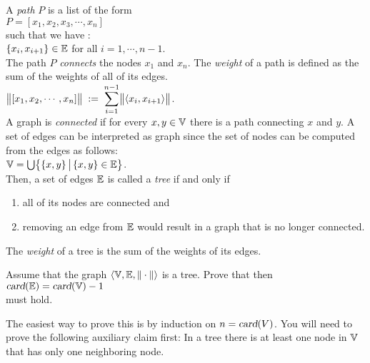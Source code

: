 \noindent
A \emph{path} $P$ is a list of the form 
\\[0.2cm]
\hspace*{1.3cm} 
$P = [ x_1, x_2, x_3, \cdots, x_n ]$ 
\\[0.2cm]
such that we have : \\[0.2cm]
\hspace*{1.3cm}
 $\{x_i,x_{i+1}\} \in {\mathbb E}$  \quad for all $i = 1, \cdots, n-1$.
\\[0.2cm]
The path $P$ \emph{connects} the nodes $x_1$ and $x_n$.  The \emph{weight} of a path is defined as
the sum of the weights of all of its edges.  
\\[0.2cm]
\hspace*{1.3cm}
 $\ds\Weight{[x_1,x_2, \cdots, x_n]} \df \sum\limits_{i=1}^{n-1} \Weight{\pair(x_i,x_{i+1})}$. 
\\[0.2cm]
A graph is \emph{connected} if for every $x,y \in {\mathbb V}$ there is a path connecting $x$ and $y$.
A set of edges can be interpreted as graph since the set of nodes can be computed from the edges as
follows: 
\\[0.2cm]
\hspace*{1.3cm}
${\mathbb V} = \bigcup \bigl\{\{x,y\} \,\big|\, \{x,y\} \in {\mathbb E} \bigr\}$.
\\[0.2cm]
Then, a set of edges ${\mathbb E}$ is called a \emph{tree} if and only if
\begin{enumerate}
\item all of its nodes are connected \quad and
\item removing an edge from ${\mathbb E}$ would result in a graph that is no longer connected.
\end{enumerate}
The \emph{weight} of a tree is the sum of the weights of its edges.

\exercise
Assume that the graph $\langle {\mathbb V}, {\mathbb E}, \|\cdot\|\rangle$ is a tree.  Prove that then
\\[0.2cm]
\hspace*{1.3cm}
$\textsl{card}({\mathbb E}) = \textsl{card}({\mathbb V}) - 1$
\\[0.2cm]
must hold.  

\hint
The easiest way to prove this is by induction on $n = \textsl{card}(V)$.  You will need to prove the
following auxiliary claim first: In a tree there is at least one node in ${\mathbb V}$ that has
only one neighboring node. 
\eox

